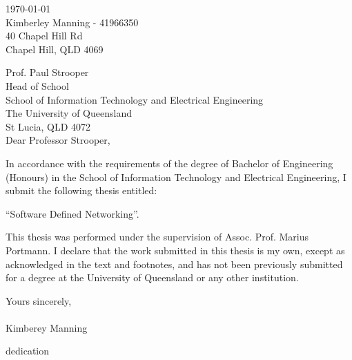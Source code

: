\begin{flushright}
        \today\\
        Kimberley Manning - 41966350\\
        40 Chapel Hill Rd\\
        Chapel Hill, QLD 4069\\
        \medskip

\end{flushright}
\begin{flushleft}
  Prof. Paul Strooper\\
  Head of School\\
  School of Information Technology and Electrical Engineering\\
  The University of Queensland\\
  St Lucia, QLD 4072\\
  \bigskip\bigskip
  Dear Professor Strooper,\\
\end{flushleft}
In accordance with the requirements of the degree of Bachelor of Engineering (Honours) in the School of Information Technology and Electrical Engineering, I submit the following thesis entitled:
\begin{center}
        ``Software Defined Networking''.\\
\end{center}
This thesis was performed under the supervision of Assoc. Prof. Marius Portmann. I declare that the work submitted in this thesis is my own, except as acknowledged in the text and footnotes, and has not been previously submitted for a degree at the University of Queensland or any other institution.



\begin{flushleft}
        \medskip
        Yours sincerely,\\
        \bigskip
        \emph\\
        \bigskip
    Kimberey Manning
\end{flushleft}

\cleardoublepage
\vspace*{70mm}
\begin{center}
\renewcommand{\baselinestretch}{1.0}
\sl


        dedication


\end{center}

